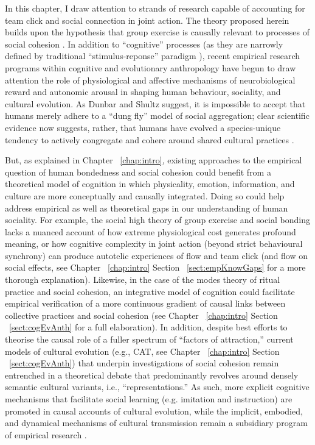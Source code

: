 \begin{CJK}{UTF8}{gbsn}
In this chapter, I draw attention to strands of research capable of accounting for team click and social connection in joint action.  The theory proposed herein builds upon the hypothesis that group exercise is causally relevant to processes of social cohesion \citep{Dunbar2010,Whitehouse2014,Cohen2017}. In addition to ``cognitive'' processes (as they are narrowly defined by traditional ``stimulus-reponse'' paradigm \citep[e.g.][]{Marr1985}), recent empirical research programs within cognitive and evolutionary anthropology have begun to draw attention the role of physiological and affective mechanisms of neurobiological reward and autonomic arousal in shaping human behaviour, sociality, and cultural evolution.  As Dunbar and Shultz suggest, it is impossible to accept that humans merely adhere to a ``dung fly'' model of social aggregation; clear scientific evidence now suggests, rather, that humans have evolved a species-unique tendency to actively congregate and cohere around shared cultural practices \citep[cf.][]{Tomasello2005}.

But, as explained in Chapter ~\ref{chap:intro}, existing approaches to the empirical question of human bondedness and social cohesion could benefit from a theoretical model of cognition in which physicality, emotion, information, and culture are more conceptually and causally integrated.  Doing so could help address empirical as well as theoretical gaps in our understanding of human sociality.  For example,  the social high theory of group exercise and social bonding \citep[cf.][]{Cohen2017} lacks a nuanced account of how extreme physiological cost generates profound meaning, or how cognitive complexity in joint action (beyond strict behavioural synchrony) can produce autotelic experiences of flow and team click (and flow on social effects, see Chapter ~\ref{chap:intro} Section ~\ref{sect:empKnowGaps} for a more thorough explanation).  Likewise, in the case of the modes theory of ritual practice and social cohesion, an integrative model of cognition could facilitate empirical verification of a more continuous gradient of causal links between collective practices and social cohesion (see Chapter ~\ref{chap:intro} Section ~\ref{sect:cogEvAnth} for a full elaboration).  In addition, despite best efforts to theorise the causal role of a fuller spectrum of ``factors of attraction,'' current models of cultural evolution (e.g., CAT, see Chapter ~\ref{chap:intro} Section ~\ref{sect:cogEvAnth}) that underpin investigations of social cohesion remain entrenched in a theoretical debate that predominantly revolves around densely semantic cultural variants, i.e., ``representations.''  As such, more explicit cognitive mechanisms that facilitate social learning (e.g. imitation and instruction) are promoted in causal accounts of cultural evolution, while the implicit, embodied, and dynamical mechanisms of cultural transmission remain a subsidiary program of empirical research \citep{Lerique2016}.


\end{CJK}
